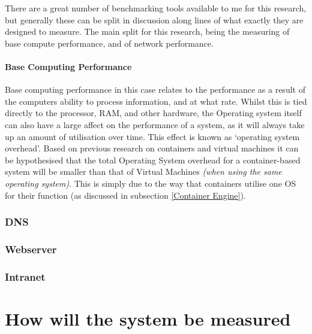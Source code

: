 There are a great number of benchmarking tools available to me for this research, but generally these can be split in discussion along lines of what exactly they are designed to measure. The main split for this research, being the measuring of base compute performance, and of network performance.

\subsubsection{Base Computing Performance}
Base computing performance in this case relates to the performance as a result of the computers ability to process information, and at what rate. Whilst this is tied directly to the processor, RAM, and other hardware, the Operating system itself can also have a large affect on the performance of a system, as it will always take up an amount of utilisation over time. This effect is known as `operating system overhead'. Based on previous research on containers and virtual machines it can be hypothesised that the total Operating System overhead for a container-based system will be smaller than that of Virtual Machines \emph{(when using the same operating system)}. This is simply due to the way that containers utilise one OS for their function (as discussed in subsection \ref{Container Engine}).


\subsection{DNS}

\subsection{Webserver}

\subsection{Intranet}

\chapter{How will the system be measured}
